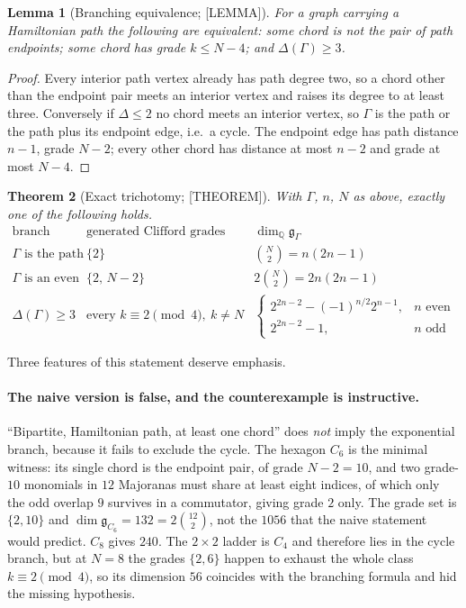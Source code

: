 \documentclass[11pt]{article}
\newtheorem{theorem}{Theorem}[section]
\newtheorem{lemma}[theorem]{Lemma}
\theoremstyle{definition}
\newcommand{\Qb}{\mathbb{Q}}
\newcommand{\alg}{\mathfrak{g}}
\begin{document}
\begin{lemma}[Branching equivalence; {[LEMMA]}]\label{lem:branch}
For a graph carrying a Hamiltonian path the following are equivalent: some chord is not the pair of
path endpoints; some chord has grade $k\le N-4$; and $\Delta(\Gamma)\ge3$.
\end{lemma}

\begin{proof}
Every interior path vertex already has path degree two, so a chord other than the endpoint pair meets
an interior vertex and raises its degree to at least three. Conversely if $\Delta\le2$ no chord meets
an interior vertex, so $\Gamma$ is the path or the path plus its endpoint edge, i.e.\ a cycle. The
endpoint edge has path distance $n-1$, grade $N-2$; every other chord has distance at most $n-2$ and
grade at most $N-4$.
\end{proof}

\begin{theorem}[Exact trichotomy; {[THEOREM]}]\label{thm:trichotomy}
With $\Gamma$, $n$, $N$ as above, exactly one of the following holds.
\[
\begin{array}{l|l|r}
\text{branch} & \text{generated Clifford grades} & \dim_\Qb\alg_\Gamma\\ \hline
\Gamma\text{ is the path} & \{2\} & \binom N2=n(2n-1)\\
\Gamma\text{ is an even cycle} & \{2,\,N-2\} & 2\binom N2=2n(2n-1)\\
\Delta(\Gamma)\ge3 & \text{every }k\equiv2\!\!\pmod 4,\ k\ne N &
\begin{cases}2^{2n-2}-(-1)^{n/2}2^{n-1}, & n\text{ even}\\ 2^{2n-2}-1, & n\text{ odd}\end{cases}
\end{array}
\]
\end{theorem}

Three features of this statement deserve emphasis.

\paragraph{The naive version is false, and the counterexample is instructive.}
``Bipartite, Hamiltonian path, at least one chord'' does \emph{not} imply the exponential branch,
because it fails to exclude the cycle. The hexagon $C_6$ is the minimal witness: its single chord is
the endpoint pair, of grade $N-2=10$, and two grade-$10$ monomials in $12$ Majoranas must share at
least eight indices, of which only the odd overlap $9$ survives in a commutator, giving grade $2$
only. The grade set is $\{2,10\}$ and $\dim\alg_{C_6}=132=2\binom{12}{2}$, not the $1056$ that the
naive statement would predict. $C_8$ gives $240$. The $2\times2$ ladder is $C_4$ and therefore lies in
the cycle branch, but at $N=8$ the grades $\{2,6\}$ happen to exhaust the whole class
$k\equiv2\pmod4$, so its dimension $56$ coincides with the branching formula and hid the missing
hypothesis.
\end{document}
